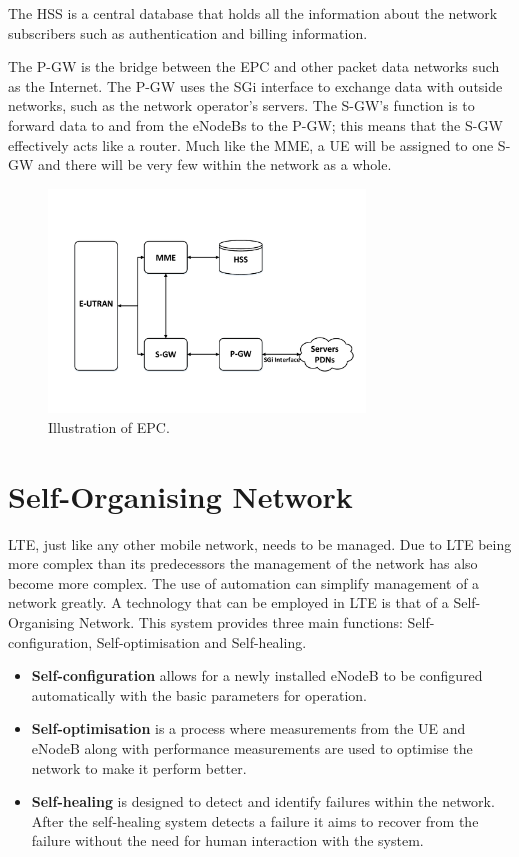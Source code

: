 The HSS is a central database that holds all the information about the network subscribers such as authentication and billing information.

The P-GW is the bridge between the EPC and other packet data networks such as the Internet. The P-GW uses the SGi interface to exchange data with outside networks, such as the network operator's servers.
The S-GW's function is to forward data to and from the eNodeBs to the P-GW; this means that the S-GW effectively acts like a router. Much like the MME, a UE will be assigned to one S-GW and there will be very few within the network as a whole.~\cite{cox2012introduction, 3gpp2013network}
\begin{figure}[H]
  \begin{center}
    	  \includegraphics[width=0.75\textwidth]{figures/lte/epc.pdf}
    \end{center}
    \caption{Illustration of EPC.}
    \label{fig:epc}
\end{figure}
\section{Self-Organising Network}\label{self organising network}
LTE, just like any other mobile network, needs to be managed. Due to LTE being more complex than its predecessors the management of the network has also become more complex. The use of automation can simplify management of a network greatly. A technology that can be employed in LTE is that of a Self-Organising Network. This system provides three main functions: Self-configuration, Self-optimisation and Self-healing.~\cite{feng2008self,3gpp2011self}
\begin{itemize}
  \item \textbf{Self-configuration} allows for a newly installed eNodeB to be configured automatically with the basic parameters for operation.  
  \item \textbf{Self-optimisation} is a process where measurements from the UE and eNodeB along with performance measurements are used to optimise the network to make it perform better.
  \item \textbf{Self-healing} is designed to detect and identify failures within the network. After the self-healing system detects a failure it aims to recover from the failure without the need for human interaction with the system.
\end{itemize}
